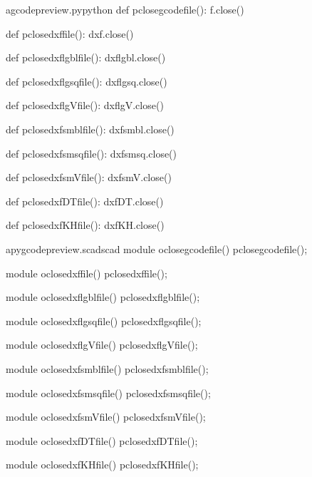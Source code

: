\documentclass{ltxdoc}
\begin{document}
\lstset{firstnumber=\thegcpy}
\begin{writecode}{a}{gcodepreview.py}{python}
def pclosegcodefile():
    f.close()

def pclosedxffile():
    dxf.close()

def pclosedxflgblfile():
    dxflgbl.close()

def pclosedxflgsqfile():
    dxflgsq.close()

def pclosedxflgVfile():
    dxflgV.close()

def pclosedxfsmblfile():
    dxfsmbl.close()

def pclosedxfsmsqfile():
    dxfsmsq.close()

def pclosedxfsmVfile():
    dxfsmV.close()

def pclosedxfDTfile():
    dxfDT.close()

def pclosedxfKHfile():
    dxfKH.close()

\end{writecode}
\addtocounter{gcpy}{30}
%

\lstset{firstnumber=\thepyscad}
\begin{writecode}{a}{pygcodepreview.scad}{scad}
module oclosegcodefile() {
    pclosegcodefile();
}

module oclosedxffile() {
    pclosedxffile();
}

module oclosedxflgblfile() {
    pclosedxflgblfile();
}

module oclosedxflgsqfile() {
    pclosedxflgsqfile();
}

module oclosedxflgVfile() {
    pclosedxflgVfile();
}

module oclosedxfsmblfile() {
    pclosedxfsmblfile();
}

module oclosedxfsmsqfile() {
    pclosedxfsmsqfile();
}

module oclosedxfsmVfile() {
    pclosedxfsmVfile();
}

module oclosedxfDTfile() {
    pclosedxfDTfile();
}

module oclosedxfKHfile() {
    pclosedxfKHfile();
}

\end{writecode}
\addtocounter{pyscad}{40}
%
\end{document}
